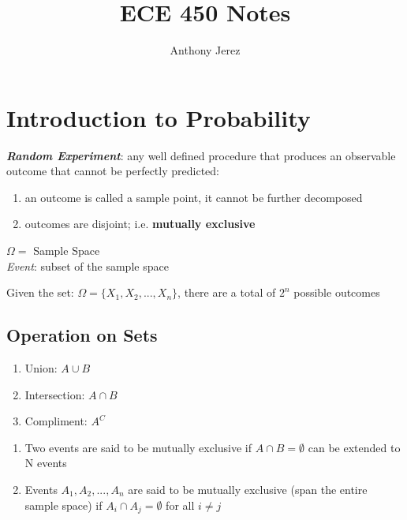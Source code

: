 \documentclass[12pt]{article}
\title{ECE 450 Notes}
\author{Anthony Jerez}
\begin{document}
    \maketitle
    \setlength{\parindent}{0pt}

    \section{Introduction to Probability}

    \textit{\textbf{Random Experiment}}: any well defined procedure 
    that produces an observable outcome that cannot be perfectly 
    predicted:
    
    \begin{enumerate}[label=(\alph*)]
        \item an outcome is called a sample point, it cannot be further 
        decomposed
        \item outcomes are disjoint; i.e. \textbf{mutually exclusive}
    \end{enumerate}
    
    \begin{center}
        $\Omega =$ Sample Space\\
        \textit{Event}: subset of the sample space
    \end{center}
    Given the set: $\Omega = \{X_1, X_2, ... , X_n\}$, there are a 
    total of $ 2^n $ possible outcomes

    \subsection{Operation on Sets}

    \begin{enumerate}
        \item Union: $A \cup B$
        \item Intersection: $A \cap B$
        \item Compliment: $A^C$
    \end{enumerate}

    \begin{enumerate}[label=(\alph*)]
        \item Two events are said to be mutually exclusive if 
        $ A \cap B = \emptyset $ can be extended to N events
        \item Events $A_1, A_2, ... , A_n$ are said to be mutually 
        exclusive (span the entire sample space) if 
        $ A_i \cap A_j = \emptyset $ for all $ i \neq j $
    \end{enumerate}
\end{document}

